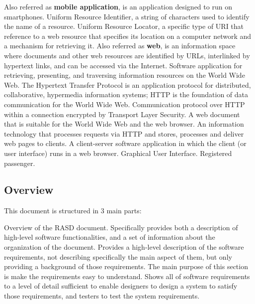 \begin{itemize}
	 Also referred as \textbf{mobile application}, is an application designed to run on smartphones.
	 Uniform Resource Identifier, a string of characters used to identify the name of a resource.
	 Uniform Resource Locator, a specific type of URI that reference to a web resource that specifies its location on a computer network and a mechanism for retrieving it.
	 Also referred as \textbf{web}, is an information space where documents and other web resources are identified by URLs, interlinked by hypertext links, and can be accessed via the Internet.
	 Software application for retrieving, presenting, and traversing information resources on the World Wide Web.
	 The Hypertext Transfer Protocol is an application protocol for distributed, collaborative, hypermedia information systems; HTTP is the foundation of data communication for the World Wide Web.
	 Communication protocol over HTTP within a connection encrypted by Transport Layer Security.
	 A web document that is suitable for the World Wide Web and the web browser.
	 An information technology that processes requests via HTTP and stores, processes and deliver web pages to clients.
	 A client-server software application in which the client (or user interface) runs in a web browser.
	 Graphical User Interface.
	 Registered passenger.
\end{itemize}
\subsection{Overview}
This document is structured in 3 main parts:
\begin{itemize}
	 Overview of the RASD document. Specifically provides both a description of high-level software functionalities, and a set of information about the organization of the document.
	 Provides a high-level description of the software requirements, not describing specifically the main aspect of them, but only providing a background of those requirements. The main purpose of this section is make the requirements easy to understand.
	 Shows all of software requirements to a level of detail sufficient to enable designers to design a system to satisfy those requirements, and testers to test the system requirements.
\end{itemize}
